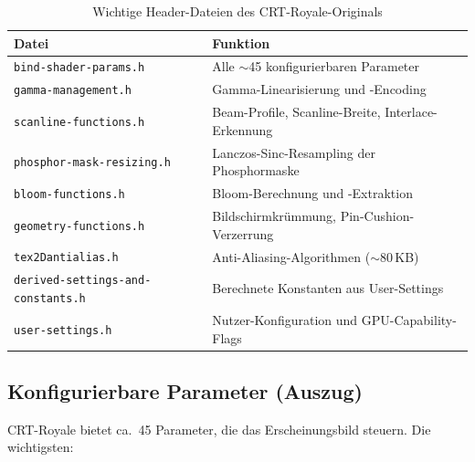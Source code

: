 \documentclass[11pt, a4paper]{article}
\newcommand{\tableheadercolor}{\rowcolor{hkared}}
\newcommand{\thw}[1]{\color{white}\textbf{#1}}  %
\begin{document}
\begin{table}[H]
\centering
\small
{}
\begin{tabularx}{\textwidth}{lX}
    \toprule
    \tableheadercolor \thw{Datei} & \thw{Funktion} \\
    \midrule
    \texttt{bind-shader-params.h} & Alle $\sim$45 konfigurierbaren Parameter \\
    \texttt{gamma-management.h} & Gamma-Linearisierung und -Encoding \\
    \texttt{scanline-functions.h} & Beam-Profile, Scanline-Breite, Interlace-Erkennung \\
    \texttt{phosphor-mask-resizing.h} & Lanczos-Sinc-Resampling der Phosphormaske \\
    \texttt{bloom-functions.h} & Bloom-Berechnung und -Extraktion \\
    \texttt{geometry-functions.h} & Bildschirmkr\"ummung, Pin-Cushion-Verzerrung \\
    \texttt{tex2Dantialias.h} & Anti-Aliasing-Algorithmen ($\sim$80\,KB) \\
    \texttt{derived-settings-and-constants.h} & Berechnete Konstanten aus User-Settings \\
    \texttt{user-settings.h} & Nutzer-Konfiguration und GPU-Capability-Flags \\
    \bottomrule
\end{tabularx}
\caption{Wichtige Header-Dateien des CRT-Royale-Originals}
\end{table}
\newpage \vspace*{-.125cm}
\subsection{Konfigurierbare Parameter (Auszug)}
\vspace{.5cm}
CRT-Royale bietet ca.\ 45 Parameter, die das Erscheinungsbild steuern. Die wichtigsten: \vspace{.25cm}
\end{document}
